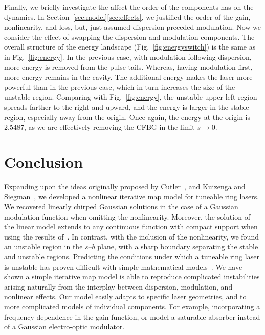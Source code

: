 \documentclass[9pt,twocolumn,twoside]{osajnl}
\begin{document}
Finally, we briefly investigate the affect the order of the components has on the dynamics. In Section~\ref{sec:model}\ref{sec:effects}, we justified the order of the gain, nonlinearity, and loss, but, just assumed dispersion preceded modulation. Now we consider the effect of swapping the dispersion and modulation components. The overall structure of the energy landscape (Fig.~\ref{fig:energyswitch}) is the same as in Fig.~\ref{fig:energy}. In the previous case, with modulation following dispersion, more energy is removed from the pulse tails. Whereas, having modulation first, more energy remains in the cavity. The additional energy makes the laser more powerful than in the previous case, which in turn increases the size of the unstable region. Comparing with Fig.~\ref{fig:energy}, the unstable upper-left region spreads farther to the right and upward, and the energy is larger in the stable region, especially away from the origin. Once again, the energy at the origin is 2.5487, as we are effectively removing the CFBG in the limit $s \rightarrow 0$.

\section{Conclusion}
\label{sec:conclusion}
Expanding upon the ideas originally proposed by Cutler~\cite{cutler1955}, and Kuizenga and Siegman~\cite{kuizenga1970, kuizenga1970a, siegman1969}, we developed a nonlinear iterative map model for tuneable ring lasers. We recovered linearly chirped Gaussian solutions in the case of a Gaussian modulation function when omitting the nonlinearity. Moreover, the solution of the linear model extends to any continuous function with compact support when using the results of~\cite{calcaterra2008a}. In contrast, with the inclusion of the nonlinearity, we found an unstable region in the $s$--$b$ plane, with a sharp boundary separating the stable and unstable regions. Predicting the conditions under which a tuneable ring laser is unstable has proven difficult with simple mathematical models~\cite{meng2020}. We have shown a simple iterative map model is able to reproduce complicated instabilities arising naturally from the interplay between dispersion, modulation, and nonlinear effects. Our model easily adapts to specific laser geometries, and to more complicated models of individual components. For example, incorporating a frequency dependence in the gain function, or model a saturable absorber instead of a Gaussian electro-optic modulator.
\end{document}

